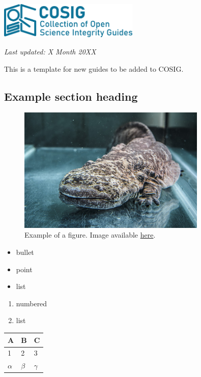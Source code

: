 \documentclass[letterpaper, 12pt]{article}
\begin{document}
\flushleft\includegraphics[width=0.5\textwidth]{img/home/241017_final_logo_mockup.png}

\textit{Last updated: X Month 20XX}

This is a template for new guides to be added to COSIG.

\subsection*{Example section heading}

\begin{figure}[h!tbp]
    \centering
    \includegraphics[width=0.8\textwidth]{img/home/chinese_giant_salamander.jpg}
    \caption*{Example of a figure. Image available \href{https://commons.wikimedia.org/wiki/File:Velemlok_\%C4\%8D\%C3\%ADnsk\%C3\%BD_zoo_praha_1.jpg}{here}.}
\end{figure}

\begin{itemize}
    \setlength\itemsep{-0.5em}
    \item bullet
    \item point
    \item list
\end{itemize}

\begin{enumerate}
    \setlength\itemsep{-0.5em}
    \item numbered
    \item list
\end{enumerate}

\pagebreak

\begin{center}
\begin{tabular}{|p{3.0cm}|p{3.0cm}|p{3.0cm}|}
\hline
     A & B & C\\ \hline\hline
     1 & 2 & 3\\\hline
     $\alpha$ & $\beta$ & $\gamma$\\ \hline
\end{tabular}
\end{center}
\end{document}
